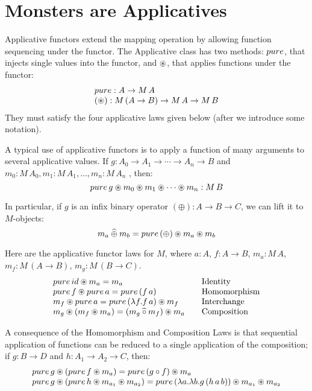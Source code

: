 \section{Monsters are Applicatives}\label{sec:applicative}

Applicative functors \cite{mcbride/paterson:2008}
extend the mapping operation by allowing function sequencing under the functor.
The Applicative class has two methods: $\apure$, that injects single values into the functor, and $\circledast$, that applies functions under the functor:
$$
\begin{array}{l}
\apure : A \rightarrow M\,A\\
(\appl): M\,(A\rightarrow B) \rightarrow M\,A \rightarrow M\,B
\end{array}
$$
They must satisfy the four applicative laws given below (after we introduce some notation).

A typical use of applicative functors is to apply a function of many arguments to several applicative values.
If $g:A_0\rightarrow A_1 \rightarrow \cdots \rightarrow A_n \rightarrow B$ and $m_0:M\,A_0, m_1:M\,A_1, \ldots, m_n:M\,A_n$ , then:
$$
\apure\,g \appl m_0 \appl m_1 \appl \cdots \appl m_n : M\,B
$$

In particular, if $g$ is an infix binary operator $(\oplus) : A \rightarrow B \rightarrow C$, we can lift it to $M$-objects:
$$
m_a \alift{\oplus} m_b 
= \apure\,(\oplus) \appl m_a \appl m_b
$$

Here are the applicative functor laws for $M$, where
 $a:A$, $f:A\rightarrow B$,
$m_a:M\,A$, $m_f:M\,(A\rightarrow B)$, $m_g:M\,(B\rightarrow C)$.
$$
\begin{array}{l@{\qquad}l}
\apure\,\id \appl m_a = m_a
  & \mbox{Identity} \\
\apure\,f \appl \apure\,a = \apure\,(f\,a)
  & \mbox{Homomorphism} \\
m_f \appl \apure\,a = \apure\,(\lambda f. f\,a) \appl m_f
  & \mbox{Interchange} \\
m_g \appl (m_f \appl m_a) = (m_g \alift{\comp} m_f) \appl m_a
  & \mbox{Composition}
\end{array}
$$

A consequence of the Homomorphism and Composition Laws is that sequential application of functions can be reduced to a single application of the composition;
if $g:B\rightarrow D$ and $h:A_1\rightarrow A_2 \rightarrow C$, then:
$$
\begin{array}{l}
\apure\,g \appl (\apure\, f \appl m_a) = \apure\, (g\comp f) \appl m_a\\
\apure\,g \appl (\apure\, h \appl m_{a_1} \appl m_{a_2})
  = \apure\, (\lambda a.\lambda b. g\,(h\,a\,b)) \appl m_{a_1} \appl m_{a_2}
\end{array}
$$

